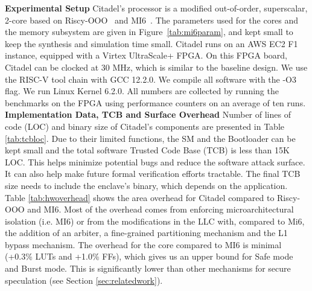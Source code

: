 \noindent\textbf{Experimental Setup}
Citadel's processor is a modified out-of-order, superscalar, 2-core based on Riscy-OOO~\cite{zhang2018composable} and MI6~\cite{bourgeat2019mi6}.
The parameters used for the cores and the memory subsystem are given in Figure~\ref{tab:mi6param}, and kept small to keep the synthesis and simulation time small.
Citadel runs on an AWS EC2 F1 instance, equipped with a Virtex UltraScale+ FPGA. 
On this FPGA board, Citadel can be clocked at $30$ MHz, which is similar to the baseline design.
We use the RISC-V tool chain with GCC 12.2.0.
We compile all software with the -O3 flag. 
We run Linux Kernel 6.2.0.
All numbers are collected by running the benchmarks on the FPGA using performance counters on an average of ten runs. 
\\

\noindent\textbf{Implementation Data, TCB and Surface Overhead}
Number of lines of code (LOC) and binary size of Citadel's components are presented in Table \ref{tab:tcbloc}.
Due to their limited functions, the SM and the Bootloader can be kept small and the total software Trusted Code Base (TCB) is less than 15K LOC.
This helps minimize potential bugs and reduce the software attack surface.
It can also help make future formal verification efforts tractable.
The final TCB size needs to include the enclave's binary, which depends on the application.
Table \ref{tab:hwoverhead} shows the area overhead for Citadel compared to Riscy-OOO\cite{zhang2018composable} and  MI6\cite{bourgeat2019mi6}.
Most of the overhead comes from enforcing microarchitectural isolation (i.e. MI6) or from the modifications in the LLC with, compared to Mi6, the addition of an arbiter, a fine-grained partitioning mechanism and the L1 bypass mechanism.
The overhead for the core compared to MI6 is minimal (+0.3\% LUTs and +1.0\% FFs), which gives us an upper bound for Safe mode and Burst mode.
This is significantly lower than other mechanisms for secure speculation (see Section \ref{sec:relatedwork}).


